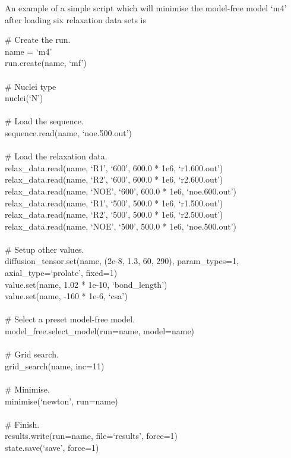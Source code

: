 
An example of a simple script which will minimise the model-free model `m4' after loading six relaxation data sets is

\begin{exampleenv}
\# Create the run. \\
name = `m4' \\
run.create(name, `mf') \\
 \\
\# Nuclei type \\
nuclei(`N') \\
 \\
\# Load the sequence. \\
sequence.read(name, `noe.500.out') \\
 \\
\# Load the relaxation data. \\
relax\_data.read(name, `R1', `600', 600.0 * 1e6, `r1.600.out') \\
relax\_data.read(name, `R2', `600', 600.0 * 1e6, `r2.600.out') \\
relax\_data.read(name, `NOE', `600', 600.0 * 1e6, `noe.600.out') \\
relax\_data.read(name, `R1', `500', 500.0 * 1e6, `r1.500.out') \\
relax\_data.read(name, `R2', `500', 500.0 * 1e6, `r2.500.out') \\
relax\_data.read(name, `NOE', `500', 500.0 * 1e6, `noe.500.out') \\
 \\
\# Setup other values. \\
diffusion\_tensor.set(name, (2e-8, 1.3, 60, 290), param\_types=1, axial\_type=`prolate', fixed=1) \\
value.set(name, 1.02 * 1e-10, `bond\_length') \\
value.set(name, -160 * 1e-6, `csa') \\
 \\
\# Select a preset model-free model. \\
model\_free.select\_model(run=name, model=name) \\
 \\
\# Grid search. \\
grid\_search(name, inc=11) \\
 \\
\# Minimise. \\
minimise(`newton', run=name) \\
 \\
\# Finish. \\
results.write(run=name, file=`results', force=1) \\
state.save(`save', force=1) \\
\end{exampleenv}

